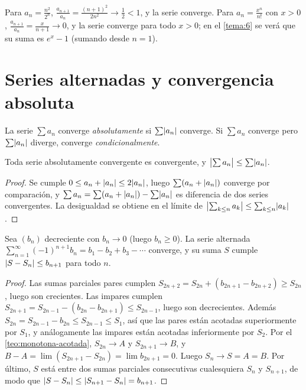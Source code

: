 \begin{ejemplo}\label{ej:cociente}
Para $a_n=\frac{n^{2}}{2^{n}}$, $\frac{a_{n+1}}{a_n}=\frac{(n+1)^{2}}{2n^{2}}\to\frac12<1$, y la serie converge. Para $a_n=\frac{x^{n}}{n!}$ con $x>0$, $\frac{a_{n+1}}{a_n}=\frac{x}{n+1}\to0$, y la serie converge para todo $x>0$; en el \cref{tema:6} se verá que su suma es $e^{x}-1$ (sumando desde $n=1$).
\end{ejemplo}

\section{Series alternadas y convergencia absoluta}

\begin{definicion}\label{def:absoluta}
La serie $\sum a_n$ converge \emph{absolutamente} si $\sum\lvert a_n\rvert$ converge. Si $\sum a_n$ converge pero $\sum\lvert a_n\rvert$ diverge, converge \emph{condicionalmente}.
\end{definicion}

\begin{teorema}\label{teo:absoluta-series}
Toda serie absolutamente convergente es convergente, y $\bigl|\sum a_n\bigr|\le\sum\lvert a_n\rvert$.
\end{teorema}

\begin{proof}
Se cumple $0\le a_n+\lvert a_n\rvert\le2\lvert a_n\rvert$, luego $\sum(a_n+\lvert a_n\rvert)$ converge por comparación, y $\sum a_n=\sum(a_n+\lvert a_n\rvert)-\sum\lvert a_n\rvert$ es diferencia de dos series convergentes. La desigualdad se obtiene en el límite de $\bigl|\sum_{k\le n}a_k\bigr|\le\sum_{k\le n}\lvert a_k\rvert$.
\end{proof}

\begin{teorema}\label{teo:leibniz}
Sea $(b_n)$ decreciente con $b_n\to0$ (luego $b_n\ge0$). La serie alternada $\sum_{n=1}^{\infty}(-1)^{n+1}b_n=b_1-b_2+b_3-\cdots$ converge, y su suma $S$ cumple $\lvert S-S_n\rvert\le b_{n+1}$ para todo $n$.
\end{teorema}

\begin{proof}
Las sumas parciales pares cumplen $S_{2n+2}=S_{2n}+(b_{2n+1}-b_{2n+2})\ge S_{2n}$, luego son crecientes. Las impares cumplen $S_{2n+1}=S_{2n-1}-(b_{2n}-b_{2n+1})\le S_{2n-1}$, luego son decrecientes. Además $S_{2n}=S_{2n-1}-b_{2n}\le S_{2n-1}\le S_1$, así que las pares están acotadas superiormente por $S_1$, y análogamente las impares están acotadas inferiormente por $S_2$. Por el \cref{teo:monotona-acotada}, $S_{2n}\to A$ y $S_{2n+1}\to B$, y $B-A=\lim(S_{2n+1}-S_{2n})=\lim b_{2n+1}=0$. Luego $S_n\to S=A=B$. Por último, $S$ está entre dos sumas parciales consecutivas cualesquiera $S_n$ y $S_{n+1}$, de modo que $\lvert S-S_n\rvert\le\lvert S_{n+1}-S_n\rvert=b_{n+1}$.
\end{proof}

